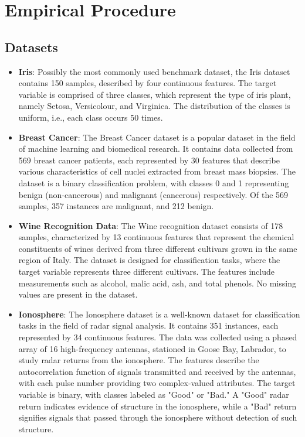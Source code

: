 \documentclass[conference]{IEEEtran}
\begin{document}
\section{Empirical Procedure} \label{Empirical-Procedure}

    \subsection{Datasets}

    \begin{itemize}
        \item \textbf{Iris}: Possibly the most commonly used benchmark dataset, the Iris dataset contains 150 samples, 
        described by four continuous features. The target variable is comprised of three classes, which represent the 
        type of iris plant, namely Setosa, Versicolour, and Virginica. The distribution of the classes is uniform, i.e., 
        each class occurs 50 times.
        
        \item \textbf{Breast Cancer}: The Breast Cancer dataset is a popular dataset in the field of machine learning and 
        biomedical research. It contains data collected from 569 breast cancer patients, each represented by 30 features 
        that describe various characteristics of cell nuclei extracted from breast mass biopsies. The dataset is a binary 
        classification problem, with classes 0 and 1 representing benign (non-cancerous) and malignant (cancerous) respectively. 
        Of the 569 samples, 357 instances are malignant, and 212 benign.
        
        \item \textbf{Wine Recognition Data}: The Wine recognition dataset consists of 178 samples, characterized by 13 
        continuous features that represent the chemical constituents of wines derived from three different cultivars grown 
        in the same region of Italy. The dataset is designed for classification tasks, where the target variable represents 
        three different cultivars. The features include measurements such as alcohol, malic acid, ash, and total phenols. 
        No missing values are present in the dataset.
        
        \item \textbf{Ionosphere}: The Ionosphere dataset is a well-known dataset for classification tasks in the field of 
        radar signal analysis. It contains 351 instances, each represented by 34 continuous features. The data was collected 
        using a phased array of 16 high-frequency antennas, stationed in Goose Bay, Labrador, to study radar returns from the 
        ionosphere. The features describe the autocorrelation function of signals transmitted and received by the antennas, 
        with each pulse number providing two complex-valued attributes. The target variable is binary, with classes labeled as 
        "Good" or "Bad." A "Good" radar return indicates evidence of structure in the ionosphere, while a "Bad" return signifies 
        signals that passed through the ionosphere without detection of such structure.
        

\end{itemize}
\end{document}
